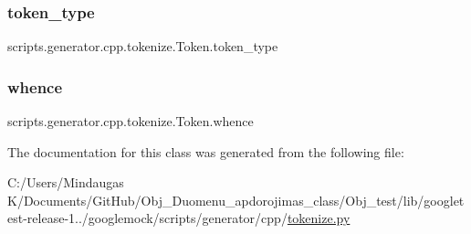 \mbox{\label{classscripts_1_1generator_1_1cpp_1_1tokenize_1_1_token_ae7baace476aa111c1cb9ab9a79597a94}} 
\subsubsection{\texorpdfstring{token\_type}{token\_type}}
{\footnotesize\ttfamily scripts.\+generator.\+cpp.\+tokenize.\+Token.\+token\+\_\+type}

\mbox{\label{classscripts_1_1generator_1_1cpp_1_1tokenize_1_1_token_af13db349aa81646a5c2cbfc41be99044}} 
\subsubsection{\texorpdfstring{whence}{whence}}
{\footnotesize\ttfamily scripts.\+generator.\+cpp.\+tokenize.\+Token.\+whence}



The documentation for this class was generated from the following file\+:\begin{DoxyCompactItemize}
\item 
C\+:/\+Users/\+Mindaugas K/\+Documents/\+Git\+Hub/\+Obj\+\_\+\+Duomenu\+\_\+apdorojimas\+\_\+class/\+Obj\+\_\+test/lib/googletest-\/release-\/1../googlemock/scripts/generator/cpp/\mbox{\hyperlink{_obj__test_2lib_2googletest-release-1_88_81_2googlemock_2scripts_2generator_2cpp_2tokenize_8py}{tokenize.\+py}}\end{DoxyCompactItemize}
